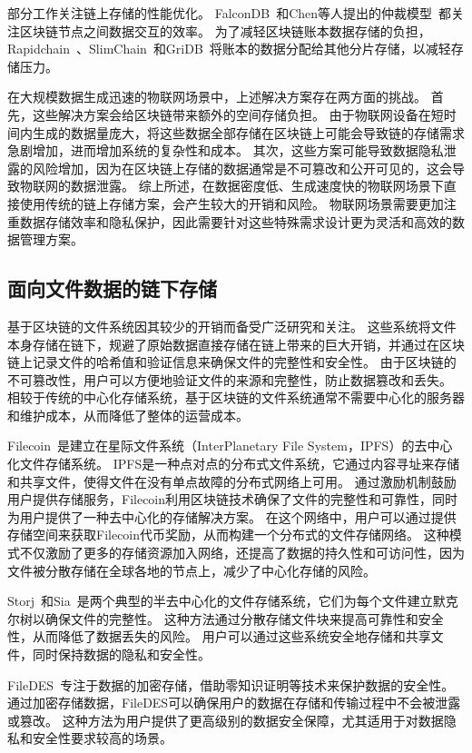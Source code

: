 部分工作关注链上存储的性能优化。
FalconDB~\cite{peng2020falcondb}和Chen等人提出的仲裁模型~\cite{chen2022blockchain}都关注区块链节点之间数据交互的效率。
为了减轻区块链账本数据存储的负担，Rapidchain~\cite{zamani2018rapidchain}、SlimChain~\cite{xu2021slimchain}和GriDB~\cite{hong2023gridb}将账本的数据分配给其他分片存储，以减轻存储压力。

在大规模数据生成迅速的物联网场景中，上述解决方案存在两方面的挑战。
首先，这些解决方案会给区块链带来额外的空间存储负担。
由于物联网设备在短时间内生成的数据量庞大，将这些数据全部存储在区块链上可能会导致链的存储需求急剧增加，进而增加系统的复杂性和成本。
其次，这些方案可能导致数据隐私泄露的风险增加，因为在区块链上存储的数据通常是不可篡改和公开可见的，这会导致物联网的数据泄露。
综上所述，在数据密度低、生成速度快的物联网场景下直接使用传统的链上存储方案，会产生较大的开销和风险。
物联网场景需要更加注重数据存储效率和隐私保护，因此需要针对这些特殊需求设计更为灵活和高效的数据管理方案。

\subsection{面向文件数据的链下存储}
基于区块链的文件系统因其较少的开销而备受广泛研究和关注。
这些系统将文件本身存储在链下，规避了原始数据直接存储在链上带来的巨大开销，并通过在区块链上记录文件的哈希值和验证信息来确保文件的完整性和安全性。
由于区块链的不可篡改性，用户可以方便地验证文件的来源和完整性，防止数据篡改和丢失。
相较于传统的中心化存储系统，基于区块链的文件系统通常不需要中心化的服务器和维护成本，从而降低了整体的运营成本。

Filecoin~\cite{bauer2022filecoin}是建立在星际文件系统（InterPlanetary File System，IPFS）的去中心化文件存储系统。
IPFS是一种点对点的分布式文件系统，它通过内容寻址来存储和共享文件，使得文件在没有单点故障的分布式网络上可用。
通过激励机制鼓励用户提供存储服务，Filecoin利用区块链技术确保了文件的完整性和可靠性，同时为用户提供了一种去中心化的存储解决方案。
在这个网络中，用户可以通过提供存储空间来获取Filecoin代币奖励，从而构建一个分布式的文件存储网络。
这种模式不仅激励了更多的存储资源加入网络，还提高了数据的持久性和可访问性，因为文件被分散存储在全球各地的节点上，减少了中心化存储的风险。

Storj~\cite{storj2018storj}和Sia~\cite{vorick2014sia}是两个典型的半去中心化的文件存储系统，它们为每个文件建立默克尔树以确保文件的完整性。
这种方法通过分散存储文件块来提高可靠性和安全性，从而降低了数据丢失的风险。
用户可以通过这些系统安全地存储和共享文件，同时保持数据的隐私和安全性。

FileDES~\cite{xu2024filedes}专注于数据的加密存储，借助零知识证明等技术来保护数据的安全性。
通过加密存储数据，FileDES可以确保用户的数据在存储和传输过程中不会被泄露或篡改。
这种方法为用户提供了更高级别的数据安全保障，尤其适用于对数据隐私和安全性要求较高的场景。


